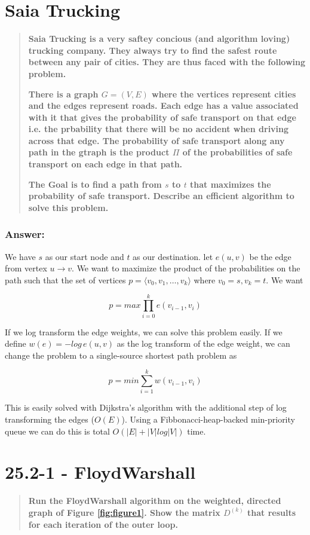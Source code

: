 \documentclass[titlepage]{article}
\theoremstyle{definition}
\begin{document}
\section{Saia Trucking}
\begin{quote}
  \textbf{Saia Trucking is a very saftey concious (and algorithm loving)
  trucking company. They always try to find the safest route between any pair
of cities. They are thus faced with the following problem.}

\textbf{There is a graph $G = (V,E)$ where the vertices represent cities and the edges
represent roads. Each edge has a value associated with it that gives the
probability of safe transport on that edge i.e. the prbability that there will
be no accident when driving across that edge. The probability of safe transport
along any path in the gtraph is the product $\Pi$ of the probabilities of safe
transport on each edge in that path.}

\textbf{The Goal is to find a path from $s$ to $t$ that maximizes the probability of
safe transport. Describe an efficient algorithm to solve this problem.  }
\end{quote}
\subsubsection{Answer:}
We have $s$ as our start node and $t$ as our destination. let $e(u,v)$ be the
edge from vertex $u \rightarrow v$. We want to maximize the product of the
probabilities on the path such that the set of vertices $p = \langle v_0, v_1,
\dots, v_k \rangle$ where $v_0 = s, v_k = t$. We want

\[ p = max \prod_{i = 0}^{k} e(v_{i-1}, v_i) \]

If we log transform the edge weights, we can solve this problem easily. If we
define $w(e) = - log \, e(u,v)$ as the log transform of the edge weight, we can
change the problem to  a single-source shortest path problem as 

\[ p = min \sum_{i=1}^{k} w(v_{i-1}, v_i) \]

This is easily solved with Dijkstra's algorithm with the additional step of log
transforming the edges ($O(E)$). Using a Fibbonacci-heap-backed min-priority
queue we can do this is total $O(|E| + |V| log |V|)$ time.


\newpage
\section{25.2-1 - Floyd\textemdash Warshall}
\begin{quote}
  \textbf{Run the Floyd\textemdash Warshall algorithm on the weighted, directed
	graph of Figure \ref{fig:figure1}. Show the matrix $D^{(k)}$ that results for each
	iteration of the outer loop.}
\end{quote}
\end{document}

